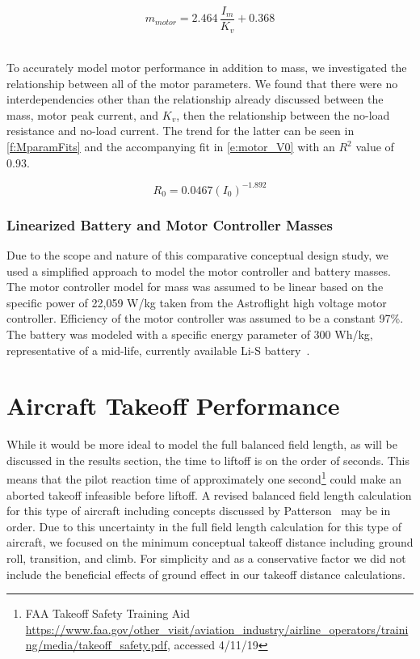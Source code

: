 \documentclass[conf]{new-aiaa}
\begin{document}
\begin{equation}
\label{eq:motorMass}
m_{motor} = 2.464\, \frac{I_{m}}{K_v}+0.368
\end{equation} \

To accurately model motor performance in addition to mass, we investigated the relationship between all of the motor parameters. We found that there were no interdependencies other than the relationship already discussed between the mass, motor peak current, and $K_v$, then the relationship between the no-load resistance and no-load current. The trend for the latter can be seen in \cref{f:MparamFits} and the accompanying fit in \cref{e:motor_V0} with an $R^2$ value of 0.93.

\begin{equation}
\label{e:motor_V0}
R_0 = 0.0467(I_0)^{-1.892}
\end{equation} 


\subsubsection{Linearized Battery and Motor Controller Masses}

Due to the scope and nature of this comparative conceptual design study, we used a simplified approach to model the motor controller and battery masses. The motor controller model for mass was assumed to be linear based on the specific power of 22,059 W/kg taken from the Astroflight high voltage motor controller. Efficiency of the motor controller was assumed to be a constant 97\%. The battery was modeled with a specific energy parameter of 300 Wh/kg, representative of a mid-life, currently available Li-S battery~\cite{Mikhaylik:2010aa}.


\section{Aircraft Takeoff Performance}
\label{sec:Performance}

While it would be more ideal to model the full balanced field length, as will be discussed in the results section, the time to liftoff is on the order of seconds. This means that the pilot reaction time of approximately one second\footnote{\label{reaction_time}FAA Takeoff Safety Training Aid \href{https://www.faa.gov/other\_visit/aviation\_industry/airline\_operators/training/media/takeoff\_safety.pdf}{https://www.faa.gov/other\_visit/aviation\_industry/airline\_operators/training/media/takeoff\_safety.pdf}, accessed 4/11/19} could make an aborted takeoff infeasible before liftoff. A revised balanced field length calculation for this type of aircraft including concepts discussed by Patterson~\cite{Patterson:2017aa} may be in order. Due to this uncertainty in the full field length calculation for this type of aircraft, we focused on the minimum conceptual takeoff distance including ground roll, transition, and climb. For simplicity and as a conservative factor we did not include the beneficial effects of ground effect in our takeoff distance calculations.
\end{document}
